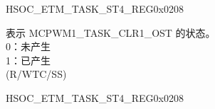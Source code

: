 \begin{register}{H}{SOC\_ETM\_TASK\_ST4\_REG}{0x0208}
\begin{regdesc}
\begin{reglist}
\label{fielddesc:SOCETMMCPWM1TASKCLR1OSTST}\item [SOC\_ETM\_MCPWM1\_TASK\_CLR1\_OST\_ST] 表示 MCPWM1\_TASK\_CLR1\_OST 的状态。\\ 0：未产生\\1：已产生\\ (R/WTC/SS)

\item [见下页...]
\end{reglist}\end{regdesc}
\end{register}

\addtocounter{Regfloat}{-1}
\begin{register}{H}{SOC\_ETM\_TASK\_ST4\_REG}{0x0208}
\begin{regdesc}\begin{reglist}
\item [接上页...]


\end{reglist}
\end{regdesc}
\end{register}
